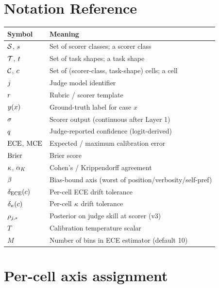 \section{Notation Reference}
\label{app:notation}

\begin{center}
\begin{tabular}{ll}
\toprule
Symbol & Meaning \\
\midrule
$\mathcal{S}$, $s$ & Set of scorer classes; a scorer class \\
$\mathcal{T}$, $t$      & Set of task shapes; a task shape \\
$\mathcal{C}$, $c$          & Set of (scorer-class, task-shape) cells; a cell \\
$j$                    & Judge model identifier \\
$r$                        & Rubric / scorer template \\
$y(x)$                & Ground-truth label for case $x$ \\
$\sigma$                         & Scorer output (continuous after Layer 1) \\
$q$                    & Judge-reported confidence (logit-derived) \\
$\mathrm{ECE}$, $\mathrm{MCE}$                   & Expected / maximum calibration error \\
$\mathrm{Brier}$                         & Brier score \\
$\kappa$, $\alpha_K$         & Cohen's / Krippendorff agreement \\
$\beta$                     & Bias-bound axis (worst of position/verbosity/self-pref) \\
$\delta_{\mathrm{ECE}}(c)$         & Per-cell ECE drift tolerance \\
$\delta_{\kappa}(c)$         & Per-cell $\kappa$ drift tolerance \\
$\rho_{j, s}$ & Posterior on judge skill at scorer (v3) \\
$T$                              & Calibration temperature scalar \\
$M$                              & Number of bins in ECE estimator (default 10) \\
\bottomrule
\end{tabular}
\end{center}

\section{Per-cell axis assignment}
\label{app:axis-assignment}

